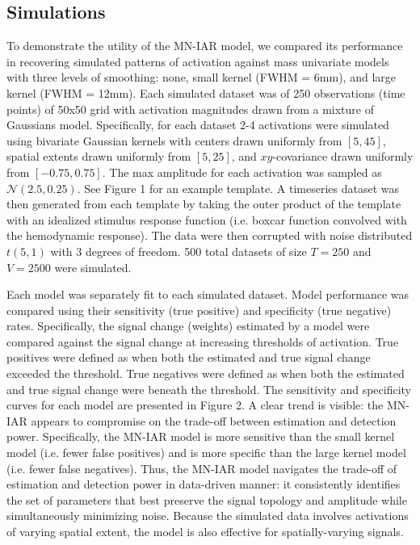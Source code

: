 \documentclass[9pt]{NEU560-final}
\begin{document}
\subsection{Simulations}
To demonstrate the utility of the MN-IAR model, we compared its performance in recovering simulated patterns of activation against mass univariate models with three levels of smoothing: none, small kernel (FWHM = 6mm), and large kernel (FWHM = 12mm). Each simulated dataset was of 250 observations (time points) of 50x50 grid with activation magnitudes drawn from a mixture of Gaussians model. Specifically, for each dataset 2-4 activations were simulated using bivariate Gaussian kernels with centers drawn uniformly from $[5, 45]$, spatial extents drawn uniformly from $[5,25]$, and $xy$-covariance drawn uniformly from $[-0.75, 0.75]$. The max amplitude for each activation was sampled as $\mathcal{N}(2.5, 0.25)$. See Figure 1 for an example template. A timeseries dataset was then generated from each template by taking the outer product of the template with an idealized stimulus response function (i.e. boxcar function convolved with the hemodynamic response). The data were then corrupted with noise distributed $t(5,1)$ with 3 degrees of freedom. 500 total datasets of size $T=250$ and $V=2500$ were simulated.

Each model was separately fit to each simulated dataset. Model performance was compared using their sensitivity (true positive) and specificity (true negative) rates. Specifically, the signal change (weights) estimated by a model were compared against the signal change at increasing thresholds of activation. True positives were defined as when both the estimated and true signal change exceeded the threshold. True negatives were defined as when both the estimated and true signal change were beneath the threshold. The sensitivity and specificity curves for each model are presented in Figure 2. A clear trend is visible: the MN-IAR appears to compromise on the trade-off between estimation and detection power. Specifically, the MN-IAR model is more sensitive than the small kernel model (i.e. fewer false positives) and is more specific than the large kernel model (i.e. fewer false negatives). Thus, the MN-IAR model navigates the trade-off of estimation and detection power in data-driven manner: it consistently identifies the set of parameters that best preserve the signal topology and amplitude while simultaneously minimizing noise. Because the simulated data involves activations of varying spatial extent, the model is also effective for spatially-varying signals.
\end{document}
